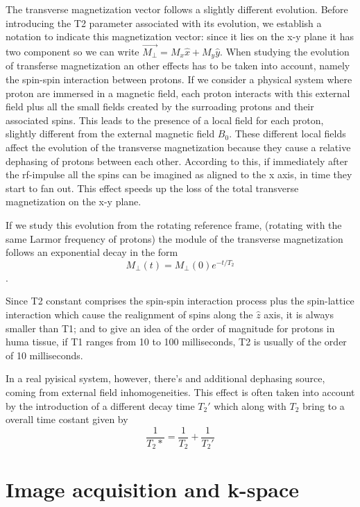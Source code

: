 \documentclass[11pt]{report}
\begin{document}
The transverse magnetization vector follows a slightly different evolution. Before introducing the T2 parameter associated with its evolution, we establish a notation to indicate this magnetization vector: since it lies on the x-y plane it has two component so we can write $\overrightarrow{M_\perp} = M_x \hat x + M_y \hat y$.
When studying the evolution of transferse magnetization an other effects has to be taken into account, namely the spin-spin interaction between protons.
If we consider a physical system where proton are immersed in a magnetic field, each proton interacts with this external field plus all the small fields created by the surroading protons and their associated spins. This leads to the presence of a local field for each proton, slightly different from the external magnetic field $B_0$.
These different local fields affect the evolution of the transverse magnetization because they cause a relative dephasing of protons between each other.
According to this, if immediately after the rf-impulse all the spins can be imagined as aligned to the x axis, in time they start to fan out. This effect speeds up the loss of the total transverse magnetization on the x-y plane.

If we study this evolution from the rotating reference frame, (rotating with the same Larmor frequency of protons) the module of the transverse magnetization follows an exponential decay in the form
\begin{equation}
M_\perp(t) = M_\perp(0) e^{-t/T_2}
\end{equation}.

Since T2 constant comprises the spin-spin interaction process plus the spin-lattice interaction which cause the realignment of spins along the $\hat z$ axis, it is always smaller than T1; and to give an idea of the order of magnitude for protons in huma tissue, if T1 ranges from 10 to 100 milliseconds, T2 is usually of the order of 10 milliseconds.


In a real pyisical system, however, there's and additional dephasing source, coming from external field inhomogeneities.
This effect is often taken into account by the introduction of a different decay time $T_2'$ which along with $T_2$ bring to a overall time costant given by
\begin{equation}
\frac{1}{T_2*} = \frac{1}{T_2}+\frac{1}{T_2'}
\end{equation}


\section{Image acquisition and k-space}
\end{document}
